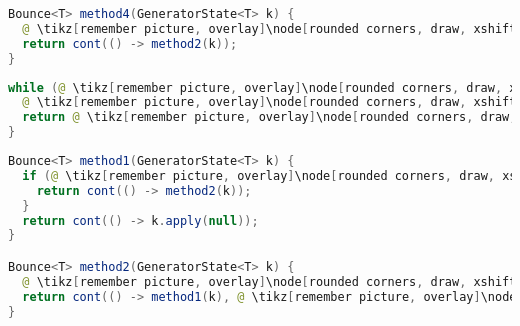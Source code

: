 \begin{center}
\begin{mdframed}[topline=true]
\begin{minipage}[t]{0.6\textwidth}
\begin{lstlisting}[language=Java, numbers=none, breaklines=true]
Bounce<T> method4(GeneratorState<T> k) {
  @ \tikz[remember picture, overlay]\node[rounded corners, draw, xshift=-0.1cm, inner sep=5pt, anchor=west] {Frissít}; \vspace*{0.3cm} @
  return cont(() -> method2(k));
}
\end{lstlisting} 
\end{minipage}
\end{mdframed}
\end{center}

\pagebreak

\begin{center}
\begin{mdframed}[topline=true]
\begin{minipage}[t]{0.4\textwidth}
\begin{lstlisting}[language=Java, numbers=none, breaklines=true]
while (@ \tikz[remember picture, overlay]\node[rounded corners, draw, xshift=-0.1cm, inner sep=5pt, anchor=west, yshift=0.1cm] {Feltétel}; \vspace*{0.3cm} \hspace*{1.14cm}@) {
  @ \tikz[remember picture, overlay]\node[rounded corners, draw, xshift=-0.1cm, inner sep=5pt, anchor=west] {Kódrészlet}; \vspace*{0.5cm} @ 
  return @ \tikz[remember picture, overlay]\node[rounded corners, draw, xshift=-0.1cm, inner sep=5pt, anchor=west, yshift=0.1cm] {Kifejezés}; \vspace*{0.3cm} @
}
\end{lstlisting}
\end{minipage} 
\begin{minipage}[t]{0.6\textwidth}
\begin{lstlisting}[language=Java, numbers=none, breaklines=true]
Bounce<T> method1(GeneratorState<T> k) {
  if (@ \tikz[remember picture, overlay]\node[rounded corners, draw, xshift=-0.1cm, inner sep=5pt, anchor=west, yshift=0.1cm] {Feltétel}; \hspace*{1.04cm} @) {
    return cont(() -> method2(k));
  }
  return cont(() -> k.apply(null));
}

Bounce<T> method2(GeneratorState<T> k) {
  @ \tikz[remember picture, overlay]\node[rounded corners, draw, xshift=-0.1cm, inner sep=5pt, anchor=west] {Kódrészlet}; \vspace*{0.3cm} @
  return cont(() -> method1(k), @ \tikz[remember picture, overlay]\node[rounded corners, draw, xshift=-0.1cm, inner sep=5pt, anchor=west, yshift=0.1cm] {Kifejezés}; \vspace*{0.2cm} \hspace*{1.2cm} @);
}
\end{lstlisting} 
\end{minipage}
\end{mdframed}
\end{center}

